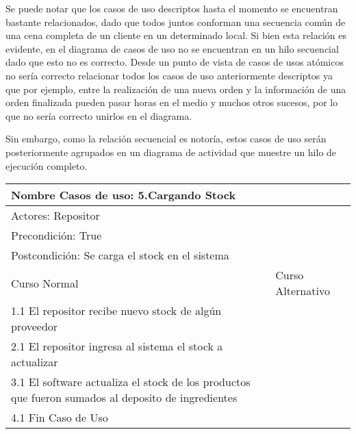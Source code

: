 \documentclass[a4paper,10pt]{article}
\begin{document}
\medskip

Se puede notar que los casos de uso descriptos hasta el momento se encuentran bastante relacionados, dado que todos juntos conforman una secuencia
com\'un de una cena completa de un cliente en un determinado local. Si bien esta relaci\'on es evidente, en el diagrama de casos de uso no se encuentran
en un hilo secuencial dado que esto no es correcto. Desde un punto de vista de casos de usos at\'omicos no ser\'ia correcto relacionar todos los casos de uso
anteriormente descriptos ya que por ejemplo, entre la realizaci\'on de una nueva orden y la informaci\'on de una orden finalizada pueden pasar horas
en el medio y muchos otros sucesos, por lo que no ser\'ia correcto unirlos en el diagrama.


Sin embargo, como la relaci\'on secuencial es notor\'ia, estos casos de uso ser\'an posteriormente agrupados en un diagrama de actividad que muestre
un hilo de ejecuci\'on completo.

\bigskip

\begin{center}
\begin{tabularx}{14cm}{|X|X|}
\hline
\multicolumn{2}{|l|}{Nombre Casos de uso: 5.Cargando Stock}\\
\hline
\multicolumn{2}{|l|}{Actores: Repositor}\\
\hline
\multicolumn{2}{|l|}{Precondici\'on: True}\\
\hline
\multicolumn{2}{|l|}{Postcondici\'on: Se carga el stock en el sistema}\\
\hline
Curso Normal & Curso Alternativo\\
\hline
1.1 El repositor recibe nuevo stock de alg\'un proveedor & 
\\
\hline
2.1 El repositor ingresa al sistema el stock a actualizar & 
\\
\hline
3.1 El software actualiza el stock de los productos que fueron sumados al deposito de ingredientes &
\\
\hline
4.1 Fin Caso de Uso &
\\
\hline
\end{tabularx}
\end{center}


\bigskip
\end{document}
